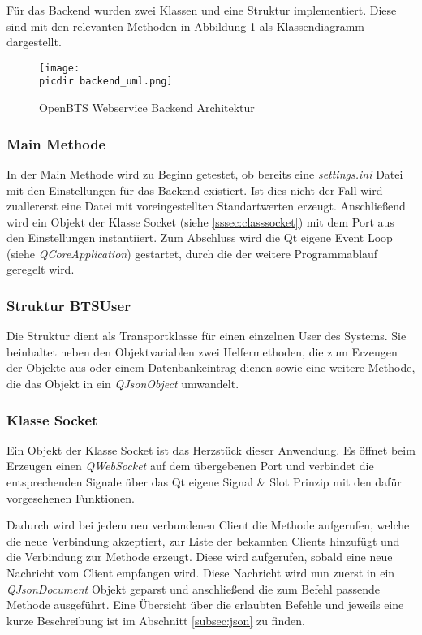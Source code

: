 Für das Backend wurden zwei Klassen und eine Struktur implementiert. Diese sind mit den relevanten Methoden in Abbildung \ref{fig:uml_class} als \UML Klassendiagramm dargestellt.
\begin{figure}[h!]
	\centering
	\texttt{[image: \\picdir backend\_uml.png]}
	\caption{\acs*{OpenBTS} Webservice Backend Architektur}
	\label{fig:uml_class}
\end{figure}

\subsubsection*{Main Methode}

In der Main Methode wird zu Beginn getestet, ob bereits eine \textit{settings.ini} Datei mit den Einstellungen für das Backend existiert. Ist dies nicht der Fall wird zuallererst eine Datei mit voreingestellten Standartwerten erzeugt. Anschließend wird ein Objekt der Klasse Socket (siehe \ref{sssec:classsocket}) mit dem Port aus den Einstellungen instantiiert. Zum Abschluss wird die Qt eigene Event Loop (siehe \textit{QCoreApplication}) gestartet, durch die der weitere Programmablauf geregelt wird.

\subsubsection*{Struktur BTSUser}
Die Struktur dient als Transportklasse für einen einzelnen User des \OpenBTS Systems. Sie beinhaltet neben den Objektvariablen zwei Helfermethoden, die zum Erzeugen der Objekte aus \JSON oder einem Datenbankeintrag dienen sowie eine weitere Methode, die das Objekt in ein \textit{QJsonObject} umwandelt.


\subsubsection*{Klasse Socket}
\label{sssec:classsocket}
Ein Objekt der Klasse Socket ist das Herzstück dieser Anwendung. Es öffnet beim Erzeugen einen \textit{QWebSocket} auf dem übergebenen Port und verbindet die entsprechenden Signale über das Qt eigene Signal \& Slot Prinzip mit den dafür vorgesehenen Funktionen.

Dadurch wird bei jedem neu verbundenen Client die Methode  aufgerufen, welche die neue Verbindung akzeptiert, zur Liste der bekannten Clients hinzufügt und die Verbindung zur  Methode erzeugt. Diese wird aufgerufen, sobald eine neue Nachricht vom Client empfangen wird. Diese Nachricht wird nun zuerst in ein \textit{QJsonDocument} Objekt geparst und anschließend die zum Befehl passende Methode ausgeführt. Eine Übersicht über die erlaubten Befehle und jeweils eine kurze Beschreibung ist im Abschnitt \ref{subsec:json} zu finden.



